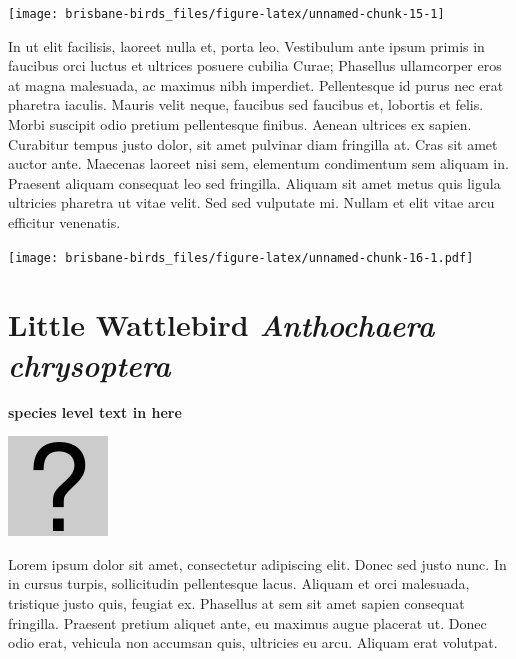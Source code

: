 \documentclass[]{book}
\let\origfigure\figure
\let\endorigfigure\endfigure
\renewenvironment{figure}[1][2] {
  \expandafter\origfigure\expandafter[H]
} {
  \endorigfigure
}
\begin{document}
\begin{figure}
\texttt{[image: brisbane-birds\_files/figure-latex/unnamed-chunk-15-1]} \caption{insert figure caption}\label{fig:unnamed-chunk-15}
\end{figure}

In ut elit facilisis, laoreet nulla et, porta leo. Vestibulum ante ipsum
primis in faucibus orci luctus et ultrices posuere cubilia Curae;
Phasellus ullamcorper eros at magna malesuada, ac maximus nibh
imperdiet. Pellentesque id purus nec erat pharetra iaculis. Mauris velit
neque, faucibus sed faucibus et, lobortis et felis. Morbi suscipit odio
pretium pellentesque finibus. Aenean ultrices ex sapien. Curabitur
tempus justo dolor, sit amet pulvinar diam fringilla at. Cras sit amet
auctor ante. Maecenas laoreet nisi sem, elementum condimentum sem
aliquam in. Praesent aliquam consequat leo sed fringilla. Aliquam sit
amet metus quis ligula ultricies pharetra ut vitae velit. Sed sed
vulputate mi. Nullam et elit vitae arcu efficitur venenatis.

\begin{figure}
\centering
\texttt{[image: brisbane-birds\_files/figure-latex/unnamed-chunk-16-1.pdf]}
\caption{\label{fig:unnamed-chunk-16}insert figure caption}
\end{figure}

\section{\texorpdfstring{Little Wattlebird \emph{Anthochaera
chrysoptera}}{Little Wattlebird Anthochaera chrysoptera}}\label{little-wattlebird-anthochaera-chrysoptera}

\textbf{species level text in here}

\begin{figure}
\centering
\includegraphics{assets/missing.png}
\caption{No image for species}
\end{figure}

Lorem ipsum dolor sit amet, consectetur adipiscing elit. Donec sed justo
nunc. In in cursus turpis, sollicitudin pellentesque lacus. Aliquam et
orci malesuada, tristique justo quis, feugiat ex. Phasellus at sem sit
amet sapien consequat fringilla. Praesent pretium aliquet ante, eu
maximus augue placerat ut. Donec odio erat, vehicula non accumsan quis,
ultricies eu arcu. Aliquam erat volutpat.
\end{document}
